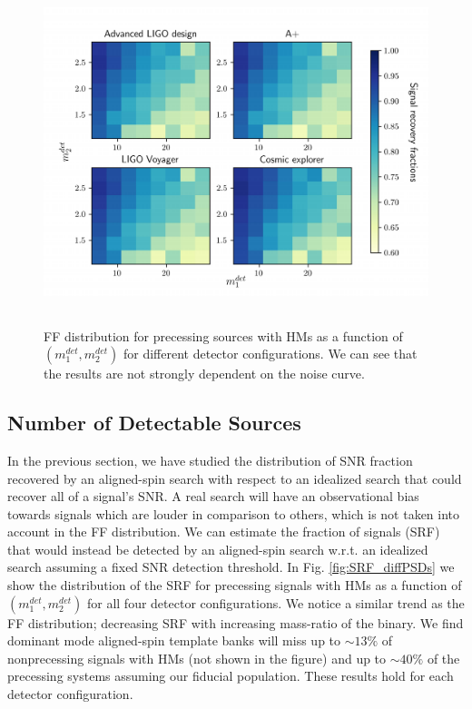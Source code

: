 \begin{figure}
        \centering
        \includegraphics[width=13cm, height=10cm]{figures/HM_and_precession/SRF_diffPSDs.pdf}
        \caption{ FF distribution for precessing sources with HMs as a function of $(m_1^{det}, m_2^{det})$ for different detector configurations. We can see that the results are not strongly dependent on the noise curve.}
        \label{fig:FF_diffPSDs}
\end{figure}

\subsection{Number of Detectable Sources}

In the previous section, we have studied the distribution of SNR fraction recovered by an aligned-spin search with respect to an idealized search that could recover all of a signal's SNR. 
A real search will have an observational bias towards signals which are louder in comparison to others, which is not taken into account in the FF distribution. We can estimate the fraction of signals (SRF) that would instead be detected by an aligned-spin search w.r.t. an idealized search assuming a fixed SNR detection threshold.
In Fig. \ref{fig:SRF_diffPSDs} we show the distribution of the SRF for precessing signals with HMs as a function of $(m_1^{det}, m_2^{det})$ for all four detector configurations. We notice a similar trend as the FF distribution; decreasing SRF with increasing mass-ratio of the binary. We find dominant mode aligned-spin template banks will miss up to $\sim 13\%$ of nonprecessing signals with HMs (not shown in the figure) and up to $\sim 40\%$ of the precessing systems assuming our fiducial population. These results hold for each detector configuration.

